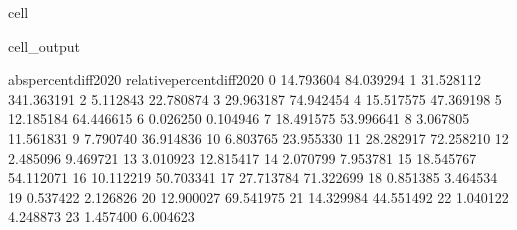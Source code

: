 \documentclass[letterpaper,10pt,english]{jupyterBook}
\begin{document}
\begin{sphinxuseclass}{cell}
\begin{sphinxVerbatimOutput}
\begin{sphinxuseclass}{cell_output}
\begin{sphinxVerbatim}[commandchars=\\\{\}]
    abs\PYGZus{}percent\PYGZus{}diff\PYGZus{}2020  relative\PYGZus{}percent\PYGZus{}diff\PYGZus{}2020  
0               14.793604                  \PYGZhy{}84.039294  
1               31.528112                 \PYGZhy{}341.363191  
2                5.112843                  \PYGZhy{}22.780874  
3               29.963187                   74.942454  
4               15.517575                   47.369198  
5               12.185184                  \PYGZhy{}64.446615  
6                0.026250                    0.104946  
7               18.491575                   53.996641  
8                3.067805                   11.561831  
9                7.790740                  \PYGZhy{}36.914836  
10               6.803765                   23.955330  
11              28.282917                   72.258210  
12               2.485096                    9.469721  
13               3.010923                  \PYGZhy{}12.815417  
14               2.070799                    7.953781  
15              18.545767                   54.112071  
16              10.112219                  \PYGZhy{}50.703341  
17              27.713784                   71.322699  
18               0.851385                   \PYGZhy{}3.464534  
19               0.537422                    2.126826  
20              12.900027                  \PYGZhy{}69.541975  
21              14.329984                   44.551492  
22               1.040122                   \PYGZhy{}4.248873  
23               1.457400                   \PYGZhy{}6.004623  
\end{sphinxVerbatim}

\end{sphinxuseclass}\end{sphinxVerbatimOutput}

\end{sphinxuseclass}
\end{document}
